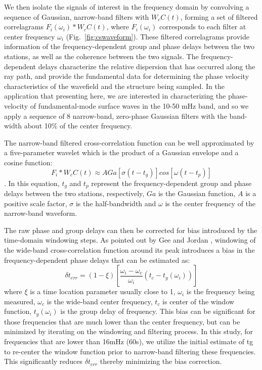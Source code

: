 \documentclass[referee]{gji}
\begin{document}
We then isolate the signals of interest in the frequency domain by convolving a sequence of Gaussian, narrow-band filters with $W_cC(t)$, forming a set of filtered correlagrams $F_i(\omega_i) \ast W_c C(t)$, where $F_i(\omega_i)$ corresponds to each filter at center frequency $\omega_i$ (Fig.~\ref{fig:cswaveform}). These filtered correlagrams provide information of the frequency-dependent group and phase delays between the two stations, as well as the coherence between the two signals. The frequency-dependent delays characterize the relative dispersion that has occurred along the ray path, and provide the fundamental data for determining the phase velocity characteristics of the wavefield and the structure being sampled.  In the application that presenting here, we are interested in characterizing the phase-velocity of fundamental-mode surface waves in the 10-50 mHz band, and so we apply a sequence of 8 narrow-band, zero-phase Gaussian filters with the band-width about 10\% of the center frequency.


The narrow-band filtered cross-correlation function can be well approximated by a five-parameter wavelet which is the product of a Gaussian envelope and a cosine function:
\[
F_i \ast W_c C(t) \approx A Ga [\sigma(t-t_g)]cos[\omega(t-t_p)]
\]
\cite{Gee:1992ww}.  In this equation, $t_g$ and $t_p$ represent the frequency-dependent group and phase delays between the two stations, respectively, $Ga$ is the Gaussian function, $A$ is a positive scale factor, $\sigma$ is the half-bandwidth and $\omega$ is the center frequency of the narrow-band waveform.

The raw phase and group delays can then be corrected for bias introduced by the time-domain windowing steps.  As pointed out by Gee and Jordan , windowing of the wide-band cross-correlation function around its peak introduces a bias in the frequency-dependent phase delays that can be estimated as:
\[
\delta t_{err} = (1-\xi)\left[\frac{\omega_i - \omega_c}{\omega_i}\left(t_c - t_g(\omega_i)\right)\right]
\]
where $\xi$ is a time location parameter usually close to 1, $\omega_i$ is the frequency being measured, $\omega_c$ is the wide-band center frequency, $t_c$ is center of the window function, $t_g(\omega_i)$ is the group delay of frequency.  This bias can be significant for those frequencies that are much lower than the center frequency, but can be minimized by iterating on the windowing and filtering process.  In this study, for frequencies that are lower than 16mHz (60s), we utilize the initial estimate of tg to re-center the window function prior to narrow-band filtering these frequencies. This significantly reduces $\delta t_{err}$ thereby minimizing the bias correction.
\end{document}
